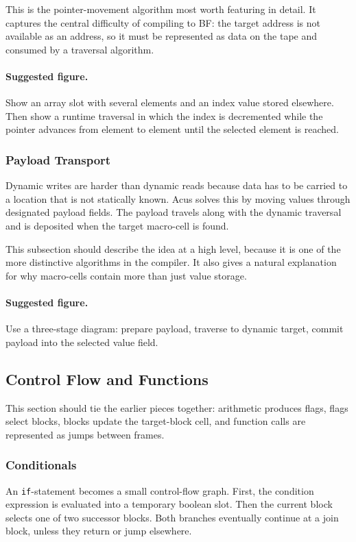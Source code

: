 This is the pointer-movement algorithm most worth featuring in detail. It captures the central difficulty of compiling to BF: the target address is not available as an address, so it must be represented as data on the tape and consumed by a traversal algorithm.

\paragraph{Suggested figure.}
Show an array slot with several elements and an index value stored elsewhere. Then show a runtime traversal in which the index is decremented while the pointer advances from element to element until the selected element is reached.

\subsubsection{Payload Transport}
Dynamic writes are harder than dynamic reads because data has to be carried to a location that is not statically known. Acus solves this by moving values through designated payload fields. The payload travels along with the dynamic traversal and is deposited when the target macro-cell is found.

This subsection should describe the idea at a high level, because it is one of the more distinctive algorithms in the compiler. It also gives a natural explanation for why macro-cells contain more than just value storage.

\paragraph{Suggested figure.}
Use a three-stage diagram: prepare payload, traverse to dynamic target, commit payload into the selected value field.

\subsection{Control Flow and Functions}
This section should tie the earlier pieces together: arithmetic produces flags, flags select blocks, blocks update the target-block cell, and function calls are represented as jumps between frames.

\subsubsection{Conditionals}
An \texttt{if}-statement becomes a small control-flow graph. First, the condition expression is evaluated into a temporary boolean slot. Then the current block selects one of two successor blocks. Both branches eventually continue at a join block, unless they return or jump elsewhere.

